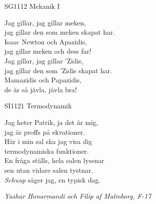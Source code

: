 \documentclass[a6paper,10pt]{article}
\begin{document}
\setlength{\oddsidemargin}{-0.37in}
\noindent
\begin{center}
\footnotesize SG1112 Mekanik I\\
\end{center}
Jag gillar, jag gillar meken, \\
jag gillar den som meken skapat har. \\
Isaac Newton och Apazidis, \\
jag gillar meken och dess far!
\vspace{5pt} \\
Jag gillar, jag gillar 'Zidis, \\
jag gillar den som 'Zidis skapat har. \\
Mamazidis och Papazidis, \\
de är så jävla, jävla bra!

\vspace{20pt}
\begin{center}
\footnotesize SI1121 Termodynamik\\
\end{center}
Jag heter Patrik, ja det är mig, \\
jag är proffs på ekvationer. \\
Här i min sal ska jag visa dig \\
termodynamiska funktioner. \\
En fråga ställs, hela salen lyssnar \\
sen utan vidare salen tystnar. \\
\textit{Schuup} säger jag, en typisk dag. 
\begin{flushright}
\textit{Yashar Honarmandi och Filip af Malmborg, F-17}
\end{flushright}
\end{document}
